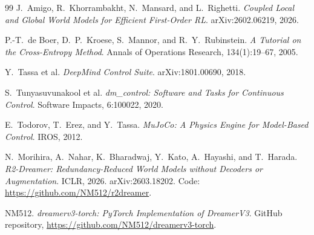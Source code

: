 \documentclass[11pt,a4paper]{article}
\begin{document}
\begin{thebibliography}{99}
 J.~Amigo, R.~Khorrambakht, N.~Mansard, and L.~Righetti.
\emph{Coupled Local and Global World Models for Efficient First-Order RL}.
arXiv:2602.06219, 2026.

 P.-T.~de Boer, D.~P.~Kroese, S.~Mannor, and R.~Y.~Rubinstein.
\emph{A Tutorial on the Cross-Entropy Method}. Annals of Operations Research,
134(1):19--67, 2005.

 Y.~Tassa et al. \emph{DeepMind Control Suite}. arXiv:1801.00690,
2018.

 S.~Tunyasuvunakool et al.
\emph{dm\_control: Software and Tasks for Continuous Control}.
Software Impacts, 6:100022, 2020.

 E.~Todorov, T.~Erez, and Y.~Tassa.
\emph{MuJoCo: A Physics Engine for Model-Based Control}. IROS, 2012.

 N.~Morihira, A.~Nahar, K.~Bharadwaj, Y.~Kato, A.~Hayashi,
and T.~Harada. \emph{R2-Dreamer: Redundancy-Reduced World Models without Decoders
or Augmentation}. ICLR, 2026. arXiv:2603.18202. Code:
\url{https://github.com/NM512/r2dreamer}.

 NM512. \emph{dreamerv3-torch: PyTorch Implementation of
DreamerV3}. GitHub repository, \url{https://github.com/NM512/dreamerv3-torch}.

\end{thebibliography}
\end{document}
